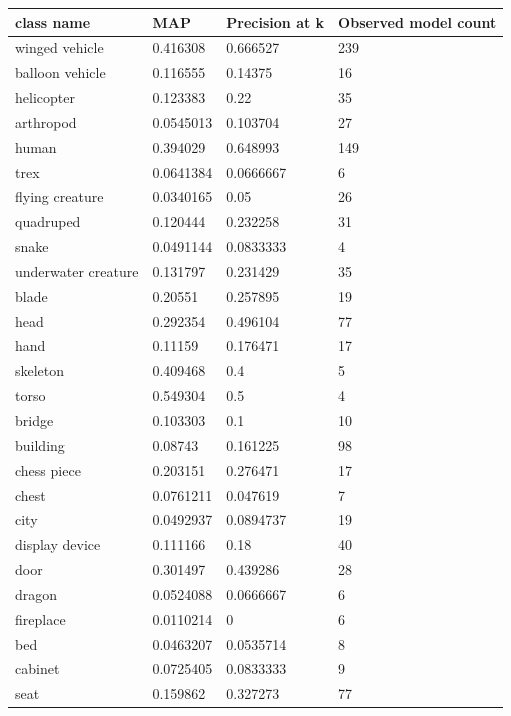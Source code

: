 \documentclass{bigdata}
\begin{document}
\begin{minipage}{\linewidth}
\begin{center}
\begin{tabular}
{ l | l | l | l}
\textbf{class name} & \textbf{MAP} & \textbf{Precision at k} & \textbf{Observed model count} \\ \hline
winged vehicle & 0.416308 & 0.666527 & 239 \\ \hline
balloon vehicle & 0.116555 & 0.14375 & 16 \\ \hline
helicopter & 0.123383 & 0.22 & 35 \\ \hline
arthropod & 0.0545013 & 0.103704 & 27 \\ \hline
human & 0.394029 & 0.648993 & 149 \\ \hline
trex & 0.0641384 & 0.0666667 & 6 \\ \hline
flying creature & 0.0340165 & 0.05 & 26 \\ \hline
quadruped & 0.120444 & 0.232258 & 31 \\ \hline
snake & 0.0491144 & 0.0833333 & 4 \\ \hline
underwater creature & 0.131797 & 0.231429 & 35 \\ \hline
blade & 0.20551 & 0.257895 & 19 \\ \hline
head & 0.292354 & 0.496104 & 77 \\ \hline
hand & 0.11159 & 0.176471 & 17 \\ \hline
skeleton & 0.409468 & 0.4 & 5 \\ \hline
torso & 0.549304 & 0.5 & 4 \\ \hline
bridge & 0.103303 & 0.1 & 10 \\ \hline
building & 0.08743 & 0.161225 & 98 \\ \hline
chess piece & 0.203151 & 0.276471 & 17 \\ \hline
chest & 0.0761211 & 0.047619 & 7 \\ \hline
city & 0.0492937 & 0.0894737 & 19 \\ \hline
display device & 0.111166 & 0.18 & 40 \\ \hline
door & 0.301497 & 0.439286 & 28 \\ \hline
dragon & 0.0524088 & 0.0666667 & 6 \\ \hline
fireplace & 0.0110214 & 0 & 6 \\ \hline
bed & 0.0463207 & 0.0535714 & 8 \\ \hline
cabinet & 0.0725405 & 0.0833333 & 9 \\ \hline
seat & 0.159862 & 0.327273 & 77 \\ \hline

\end{tabular}
\end{center}
\end{minipage}
\end{document}
